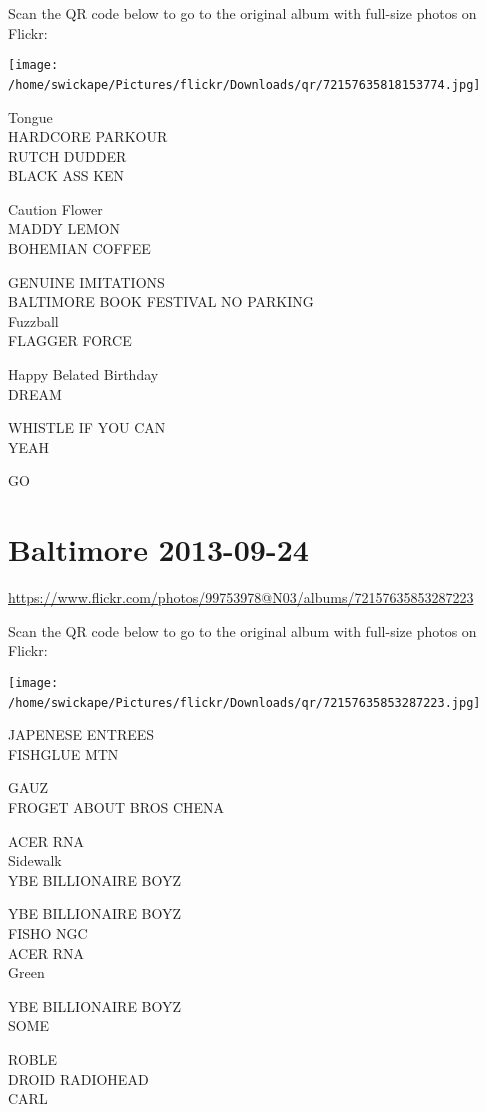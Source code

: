\documentclass[10pt,letterpaper]{article}
\begin{document}
Scan the QR code below to go to the original album with full-size photos on Flickr:

\texttt{[image: /home/swickape/Pictures/flickr/Downloads/qr/72157635818153774.jpg]}
\

Tongue\\
HARDCORE PARKOUR\\
RUTCH DUDDER\\
BLACK ASS KEN

Caution Flower\\
MADDY LEMON\\
BOHEMIAN COFFEE

GENUINE IMITATIONS\\
BALTIMORE BOOK FESTIVAL NO PARKING\\
Fuzzball\\
FLAGGER FORCE

Happy Belated Birthday\\
DREAM

WHISTLE IF YOU CAN\\
YEAH

GO
\

\section*{Baltimore 2013-09-24}

\url{https://www.flickr.com/photos/99753978@N03/albums/72157635853287223}

Scan the QR code below to go to the original album with full-size photos on Flickr:

\texttt{[image: /home/swickape/Pictures/flickr/Downloads/qr/72157635853287223.jpg]}
\

JAPENESE ENTREES\\
FISHGLUE MTN

GAUZ\\
FROGET ABOUT BROS CHENA

ACER RNA\\
Sidewalk\\
YBE BILLIONAIRE BOYZ

YBE BILLIONAIRE BOYZ\\
FISHO NGC\\
ACER RNA\\
Green

YBE BILLIONAIRE BOYZ\\
SOME

ROBLE\\
DROID RADIOHEAD\\
CARL
\end{document}
